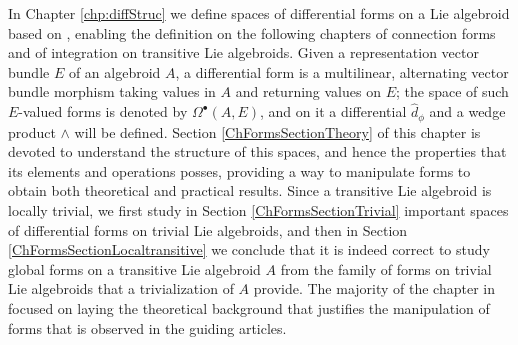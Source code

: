 In Chapter \ref{chp:diffStruc} we define spaces of differential forms on a Lie algebroid based on \cite{Lazzarini2012}, enabling the definition on the following chapters of connection forms and of integration on transitive Lie algebroids. Given a representation vector bundle $E$ of an algebroid $A$, a differential form is a multilinear, alternating vector bundle morphism taking values in $A$ and returning values on $E$; the space of such $E$-valued forms is denoted by $\Omega^\bullet(A, E)$, and on it a differential $\hat d_\phi$ and a wedge product $\wedge$ will be defined. Section \ref{ChFormsSectionTheory} of this chapter is devoted to understand the structure of this spaces, and hence the properties that its elements and operations posses, providing a way to manipulate forms to obtain both theoretical and practical results. Since a transitive Lie algebroid is locally trivial, we first study in Section \ref{ChFormsSectionTrivial} important spaces of differential forms on trivial Lie algebroids, and then in Section \ref{ChFormsSectionLocaltransitive} we conclude that it is indeed correct to study global forms on a transitive Lie algebroid $A$ from the family of forms on trivial Lie algebroids that a trivialization of $A$ provide. The majority of the chapter in focused on laying the theoretical background that justifies the manipulation of forms that is observed in the guiding articles.


